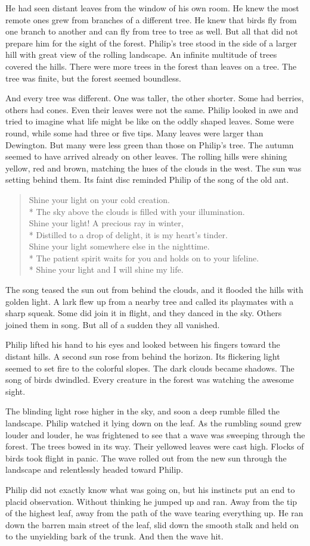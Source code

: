 \documentclass[10pt]{memoir}
\newcommand{\sunsong}{
  Shine your light on your cold creation. \\*
  The sky above the clouds is filled with your illumination. \\
  Shine your light! A precious ray in winter, \\*
  Distilled to a drop of delight, it is my heart's tinder. \\
  Shine your light somewhere else in the nighttime. \\*
  The patient spirit waits for you and holds on to your lifeline. \\*
  Shine your light and I will shine my life.
}
\begin{document}
He had seen distant leaves from the window of his own room. He knew the most
remote ones grew from branches of a different tree. He knew that birds fly from
one branch to another and can fly from tree to tree as well. But all that did
not prepare him for the sight of the forest. Philip's tree stood in the side of
a larger hill with great view of the rolling landscape. An infinite multitude
of trees covered the hills. There were more trees in the forest than leaves on
a tree. The tree was finite, but the forest seemed boundless.

And every tree was different. One was taller, the other shorter. Some had
berries, others had cones. Even their leaves were not the same. Philip looked
in awe and tried to imagine what life might be like on the oddly shaped leaves.
Some were round, while some had three or five tips. Many leaves were larger
than Dewington. But many were less green than those on Philip's tree. The
autumn seemed to have arrived already on other leaves. The rolling hills were
shining yellow, red and brown, matching the hues of the clouds in the west.
The sun was setting behind them. Its faint disc reminded Philip of the song of
the old ant.


\begin{verse}
\sunsong
\end{verse}


The song teased the sun out from behind the clouds, and it flooded the hills
with golden light. A lark flew up from a nearby tree and called its playmates
with a sharp squeak. Some did join it in flight, and they danced in the sky.
Others joined them in song. But all of a sudden they all vanished.

Philip lifted his hand to his eyes and looked between his fingers toward the
distant hills. A second sun rose from behind the horizon. Its flickering light
seemed to set fire to the colorful slopes. The dark clouds became shadows. The
song of birds dwindled. Every creature in the forest was watching the awesome
sight.

The blinding light rose higher in the sky, and soon a deep rumble filled the
landscape. Philip watched it lying down on the leaf. As the rumbling sound grew
louder and louder, he was frightened to see that a wave was sweeping through
the forest. The trees bowed in its way. Their yellowed leaves were cast high.
Flocks of birds took flight in panic. The wave rolled out from the new sun
through the landscape and relentlessly headed toward Philip.

Philip did not exactly know what was going on, but his instincts put an end to
placid observation. Without thinking he jumped up and ran. Away from the tip of
the highest leaf, away from the path of the wave tearing everything up. He ran
down the barren main street of the leaf, slid down the smooth stalk and held on
to the unyielding bark of the trunk. And then the wave hit.
\end{document}
